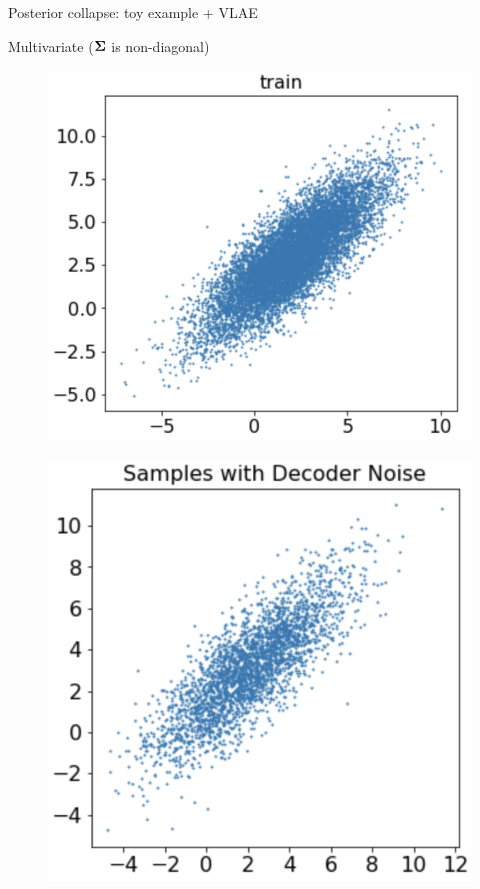 \begin{frame}{Posterior collapse: toy example + VLAE}
	\begin{block}{Multivariate ($\boldsymbol{\Sigma}$ is non-diagonal)}
		\vspace{-0.5cm}
		\begin{minipage}[t]{0.33\columnwidth}
			\begin{figure}[h]
				\centering
				\includegraphics[width=.8\linewidth]{figs/posterior_collapse_toy_1.png}
			\end{figure}
		\end{minipage}%
		\begin{minipage}[t]{0.33\columnwidth}
			\begin{figure}[h]
				\centering
				\includegraphics[width=0.75\linewidth]{figs/posterior_collapse_toy_3.png}

\end{figure}
\end{minipage}
\end{block}
\end{frame}
